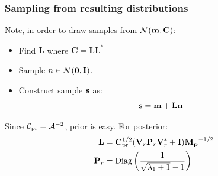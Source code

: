 \documentclass[
  pdf,
  10pt,
  xcolor={svgnames},
]{beamer}
\newcommand{\mc}[1]{\mathcal{#1}}
\newcommand{\mat}[1]{\mathbf{{#1}}}
\begin{document}
\begin{frame}
  \frametitle{Sampling from resulting distributions}
  Note, in order to draw samples from $\mc{N}(\vb{m}, \mat{C})$:
  \begin{itemize}
    \item Find $\mat{L}$ where $\mat{C} = \mat{L} \mat{L}^*$
    \item Sample $n \in \mc{N}(\vb{0}, \mat{I})$.
    \item Construct sample $\vb{s}$ as:
      \[
        \vb{s} = \vb{m} + \mat{L} \vb{n}
      \]
  \end{itemize}
  \pause
  Since $\mc{C}_{\rm pr} = \mc{A}^{-2}$, prior is easy. For posterior:
  \begin{align*}
    \mat{L}
    &= 
    \mat{C}_{\rm pr}^{1/2}
    (\mat{V}_r \mat{P}_r \mat{V}_r^* + \mat{I})
    \mat{M_p}^{-1/2} \\
    \mat{P}_r
    &=
    {\rm Diag}\left(
      \frac{1}{\sqrt{\lambda_1 + 1} - 1}
    \right)
  \end{align*}
\end{frame}

\end{document}
